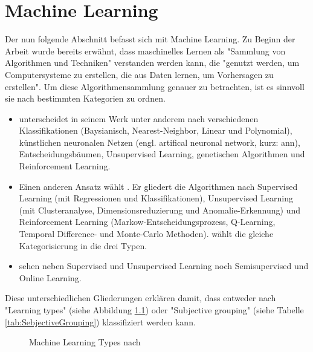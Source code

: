 \chapter{Machine Learning}\label{sec:MachineLearning}
Der nun folgende Abschnitt befasst sich mit Machine Learning. Zu Beginn der Arbeit wurde bereits erwähnt, dass maschinelles Lernen als "Sammlung von Algorithmen und Techniken" verstanden werden kann, die "genutzt werden, um Computersysteme zu erstellen, die aus Daten lernen, um Vorhersagen zu erstellen".\citep[S.~53; eigene Übersetzung]{swamynathan_mastering_2017} Um diese Algorithmensammlung genauer zu betrachten, ist es sinnvoll sie nach bestimmten Kategorien zu ordnen. 
\begin{itemize}
\item \citep{kubat_introduction_2017} unterscheidet in seinem Werk unter anderem nach verschiedenen Klassifikationen (Baysianisch, Nearest-Neighbor, Linear und Polynomial), künstlichen neuronalen Netzen (engl. artifical neuronal network, kurz: \gls{ann}), Entscheidungsbäumen, Unsupervised Learning, genetischen Algorithmen und Reinforcement Learning.
\item Einen anderen Ansatz wählt \citep{swamynathan_mastering_2017}. Er gliedert die Algorithmen nach Supervised Learning (mit Regressionen und Klassifikationen), Unsupervised Learning (mit Clusteranalyse, Dimensionsreduzierung und Anomalie-Erkennung) und Reinforcement Learning (Markow-Entscheidungsprozess, Q-Learning, Temporal Difference- und Monte-Carlo Methoden). \citep{kim_matlab_2017} wählt die gleiche Kategorisierung in die drei Typen.
\item \citep{paluszek_matlab_2017} sehen neben Supervised und Unsupervised Learning noch Semisupervised und Online Learning.
\end{itemize}
Diese unterschiedlichen Gliederungen erklären \citep[S.~222]{ramasubramanian_machine_2017} damit, dass entweder nach "Learning types" (siehe Abbildung \ref{fig:MachineLearningTypes_all}) oder "Subjective grouping" (siehe Tabelle \ref{tab:SebjectiveGrouping}) klassifiziert werden kann.
\begin{figure}[H]
\centering
{}
\caption{Machine Learning Types nach \citep[S.~222]{ramasubramanian_machine_2017}}
\label{fig:MachineLearningTypes_all}
\end{figure}

